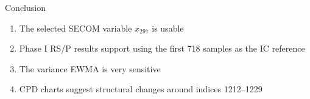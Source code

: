 \documentclass[aspectratio=169,12pt]{beamer}
\begin{document}
\begin{frame}{Conclusion}
\begin{enumerate}
    \item The selected SECOM variable $x_{297}$ is usable
    \vspace{0.5em}
    \item Phase I RS/P results support using the first 718 samples as the IC reference
    \vspace{0.5em}
    \item The variance EWMA is very sensitive
    \vspace{0.5em}
    \item CPD charts suggest structural changes around indices 1212--1229
\end{enumerate}
\end{frame}
\end{document}

